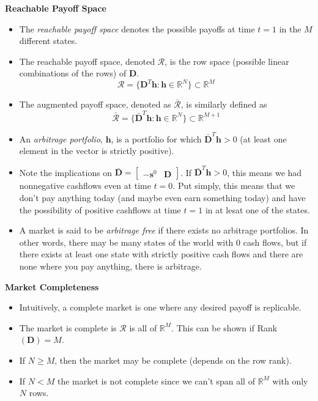\documentclass[11pt]{article}
\begin{document}
\textbf{Reachable Payoff Space}
\begin{itemize}
    \item The \textit{reachable payoff space} denotes the possible payoffs at time $t=1$ in the 
    $M$ different states. 
    \item The reachable payoff space, denoted $\mathcal{R}$, is the row space (possible linear 
    combinations of the rows) of $\boldsymbol{D}$.
    \[\mathcal{R} = \{\boldsymbol{D}^T \boldsymbol{h}: \boldsymbol{h} \in \mathbb{R}^N\} 
    \subset \mathbb{R}^M\]
    \item The augmented payoff space, denoted as $\mathcal{\bar{R}}$, is similarly defined as
    \[\mathcal{\bar{R}} = \{\boldsymbol{\bar{D}}^T \boldsymbol{h}: \boldsymbol{h} \in 
    \mathbb{R}^N\} \subset \mathbb{R}^{M+1}\]
    \item An \textit{arbitrage portfolio}, $\boldsymbol{h}$, is a portfolio for which 
    $\boldsymbol{\bar{D}}^T \boldsymbol{h} > 0$ (at least one element in the vector is strictly 
    positive). 
    \item Note the implications on $\bar{\boldsymbol{D}} = \begin{bmatrix} -\boldsymbol{s}^0 & 
    \boldsymbol{D} \end{bmatrix}$. If $\boldsymbol{\bar{D}}^T \boldsymbol{h} > 0$, this means we 
    had nonnegative cashflows even at time $t=0$. Put simply, this means that we don't pay 
    anything today (and maybe even earn something today) and have the possibility of positive 
    cashflows at time $t=1$ in at lesat one of the states. 
    \item A market is said to be \textit{arbitrage free} if there exists no arbitrage 
    portfolios. In other words, there may be many states of the world with 0 cash flows, but if
    there exists at least one state with strictly positive cash flows and there are none where 
    you pay anything, there is arbitrage.
\end{itemize}

\textbf{Market Completeness}
\begin{itemize}
    \item Intuitively, a complete market is one where any desired payoff is replicable.
    \item The market is complete is $\mathcal{R}$ is all of $\mathbb{R}^M$. This can be shown 
    if Rank$(\boldsymbol{D}) = M$.
    \item If $N \ge M$, then the market may be complete (depends on the row rank).
    \item If $N < M$ the market is not complete since we can't span all of $\mathbb{R}^M$ with 
    only $N$ rows.
\end{itemize}
\end{document}
